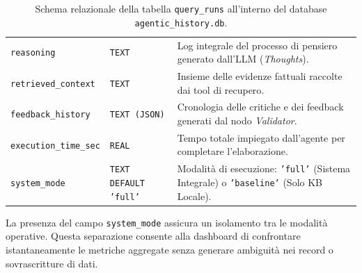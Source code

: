 \begin{table}[htbp]
\begin{tabularx}{\textwidth}{l p{3.2cm} X}
\texttt{reasoning} & \texttt{TEXT} & Log integrale del processo di pensiero generato dall'LLM (\textit{Thoughts}). \\
\texttt{retrieved\_context} & \texttt{TEXT} & Insieme delle evidenze fattuali raccolte dai tool di recupero. \\
\texttt{feedback\_history} & \texttt{TEXT (JSON)} & Cronologia delle critiche e dei feedback generati dal nodo \textit{Validator}. \\
\texttt{execution\_time\_sec} & \texttt{REAL} & Tempo totale impiegato dall'agente per completare l'elaborazione. \\
\texttt{system\_mode} & \texttt{TEXT DEFAULT 'full'} & Modalità di esecuzione: \texttt{'full'} (Sistema Integrale) o \texttt{'baseline'} (Solo KB Locale). \\
\bottomrule
\end{tabularx}
\caption{Schema relazionale della tabella \texttt{query\_runs} all'interno del database \texttt{agentic\_history.db}.}
\label{tab:schema_query_runs}
\end{table}

La presenza del campo \texttt{system\_mode} assicura un isolamento tra le modalità operative. Questa separazione consente alla dashboard di confrontare istantaneamente le metriche aggregate senza generare ambiguità nei record o sovrascritture di dati.
